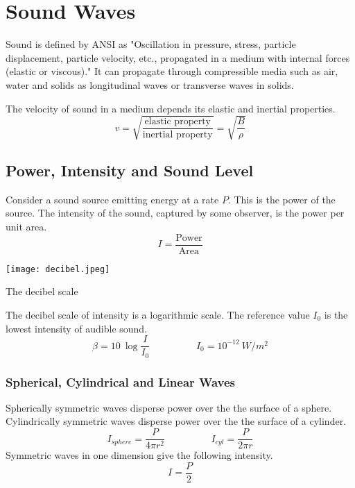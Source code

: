 \section{Sound Waves}
Sound is defined by ANSI as "Oscillation in pressure, stress, particle displacement, particle velocity, etc., propagated in a medium with internal forces (elastic or viscous)."  It can propagate through compressible media such as air, water and solids as longitudinal waves or transverse waves in solids. 


The velocity of sound in a medium depends its elastic and inertial properties.
$$v=\sqrt{\frac{\text{elastic property}}{\text{inertial property}}}=\sqrt{\frac{B}{\rho}}$$
\subsection{Power, Intensity and Sound Level}
Consider a sound source emitting energy at a rate $P$.  This is the power of the source.  The intensity of the sound, captured by some observer, is the power per unit area.
$$I=\frac{\text{Power}}{\text{Area}}$$
\begin{marginfigure}[0pt]
  \texttt{[image: decibel.jpeg]}
  \caption{The decibel scale}
  \label{fig:marginfig}
\end{marginfigure}
The decibel scale of intensity is a logarithmic scale.  The reference value $I_0$ is the lowest intensity of audible sound.
$$\beta=10\  \log \frac{I}{I_0} \hspace{2cm} I_0=10^{-12} \ W/m^2$$

\subsubsection{Spherical, Cylindrical and Linear Waves}
Spherically symmetric waves disperse power over the the surface of a sphere.  Cylindrically symmetric waves disperse power over the the surface of a cylinder.
$$I_{sphere}=\frac{P}{4\pi r^2} \hspace{2cm} I_{cyl}=\frac{P}{2\pi r}$$
Symmetric waves in one dimension give the following intensity.
$$I=\frac{P}{2}$$


